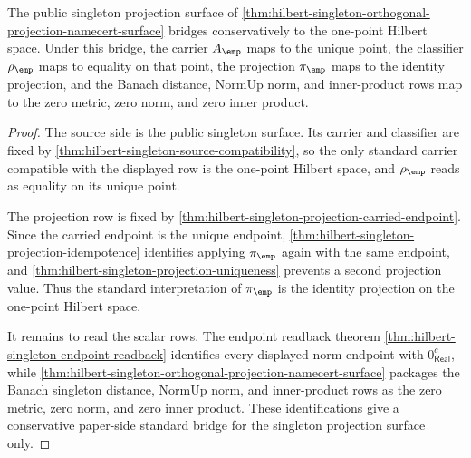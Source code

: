 \begin{theorem}
\label{thm:hilbert-singleton-projection-standard-bridge}
The public singleton projection surface of
\autoref{thm:hilbert-singleton-orthogonal-projection-namecert-surface}
bridges conservatively to the one-point Hilbert space. Under this bridge, the
carrier $A_{\emp}$ maps to the unique point, the classifier $\rho_{\emp}$ maps
to equality on that point, the projection $\pi_{\emp}$ maps to the identity
projection, and the Banach distance, NormUp norm, and inner-product rows map
to the zero metric, zero norm, and zero inner product.
\end{theorem}
\begin{proof}
The source side is the public singleton surface. Its carrier and classifier
are fixed by \autoref{thm:hilbert-singleton-source-compatibility}, so the
only standard carrier compatible with the displayed row is the one-point
Hilbert space, and $\rho_{\emp}$ reads as equality on its unique point.

The projection row is fixed by
\autoref{thm:hilbert-singleton-projection-carried-endpoint}. Since the carried
endpoint is the unique endpoint, \autoref{thm:hilbert-singleton-projection-idempotence}
identifies applying $\pi_{\emp}$ again with the same endpoint, and
\autoref{thm:hilbert-singleton-projection-uniqueness} prevents a second
projection value. Thus the standard interpretation of $\pi_{\emp}$ is the
identity projection on the one-point Hilbert space.

It remains to read the scalar rows. The endpoint readback theorem
\autoref{thm:hilbert-singleton-endpoint-readback} identifies every displayed
norm endpoint with $0_{\mathsf{Real}}^{c}$, while
\autoref{thm:hilbert-singleton-orthogonal-projection-namecert-surface}
packages the Banach singleton distance, NormUp norm, and inner-product rows
as the zero metric, zero norm, and zero inner product. These identifications
give a conservative paper-side standard bridge for the singleton projection
surface only.
\end{proof}
